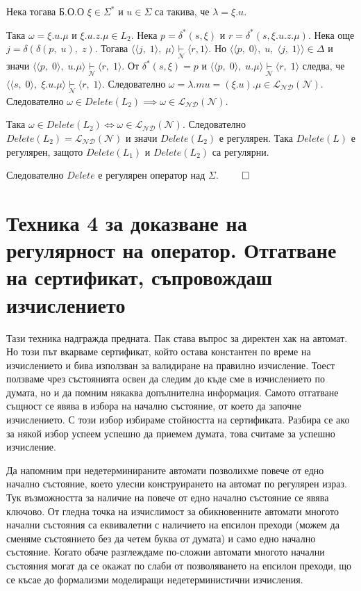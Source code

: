 \documentclass[12pt]{article}
\begin{document}
Нека тогава Б.О.О \(\xi \in \Sigma^*\) и \(u \in \Sigma\) са такива, че \(\lambda = \xi.u\).

Така \(\omega = \xi.u.\mu\) и \(\xi.u.z.\mu \in L_2\). Нека \(p = \delta^*(s, \xi)\) и \(r = \delta^*(s, \xi.u.z.\mu)\).
Нека още \(j = \delta(\delta(p,\; u),\; z)\). Тогава \(\langle \langle j,\; 1 \rangle,\; \mu \rangle \underset{\mathcal{N}}{\vdash} \langle r, 1 \rangle\). Но \(\langle \langle p,\; 0 \rangle, \; u,\; \langle j,\; 1 \rangle \rangle \in \Delta \) и значи \(\langle \langle p,\; 0 \rangle, \; u.\mu \rangle \underset{\mathcal{N}}{\vdash} \langle r,\; 1 \rangle\).
От \(\delta^*(s, \xi) = p\) и \(\langle \langle p,\; 0 \rangle, \; u.\mu \rangle \underset{\mathcal{N}}{\vdash} \langle r,\; 1 \rangle\) следва, че \(\langle \langle s,\; 0 \rangle, \; \xi.u.\mu \rangle \underset{\mathcal{N}}{\vdash} \langle r,\; 1 \rangle\).
Следователно \(\omega = \lambda.mu = (\xi.u).\mu \in \mathcal{L_{ND}}(\mathcal{N})\).
Следователно \(\omega \in Delete(L_2) \implies \omega \in \mathcal{L_{ND}}(\mathcal{N})\).


Така \(\omega \in Delete(L_2) \iff \omega \in \mathcal{L_{ND}}(\mathcal{N})\).
Следователно \(Delete(L_2) = \mathcal{L_{ND}}(\mathcal{N})\) и значи \(Delete(L_2)\) е регулярен.
Така \(Delete(L)\) е регулярен, защото \(Delete(L_1)\) и \(Delete(L_2)\) са регулярни.

Следователно \(Delete\) е регулярен оператор над \(\Sigma\). \(\qed\)

\section*{Техника 4 за доказване на регулярност на оператор. Отгатване на сертификат, съпровождаш изчислението}
Тази техника надгражда предната. Пак става въпрос за директен хак на автомат. Но този път вкарваме сертификат, който остава константен по време на изчислението и бива използван за валидиране на правилно изчисление. Тоест ползваме чрез състоянията освен да следим до къде сме в изчислението по думата, но и да помним някаква допълнителна информация. Самото отгатване същност се явява в избора на начално състояние, от което да започне изчислението. С този избор избираме стойността на сертификата. Разбира се ако за някой избор успеем успешно да приемем думата, това считаме за успешно изчисление. \\

\par Да напомним при недетерминираните автомати позволихме повече от едно начално състояние, което улесни конструирането на автомат по регулярен израз. Тук възможността за наличие на повече от едно начално състояние се явява ключово. От гледна точка на изчислимост за обикновенните автомати многото начални състояния са еквивалетни с наличието на епсилон преходи (можем да сменяме състоянието без да четем буква от думата) и само едно начално състояние. Когато обаче разглеждаме по-сложни автомати многото начални състояния могат да се окажат по слаби от позволяването на епсилон преходи, що се късае до формализми моделиращи недетерминистични изчисления.
\end{document}
